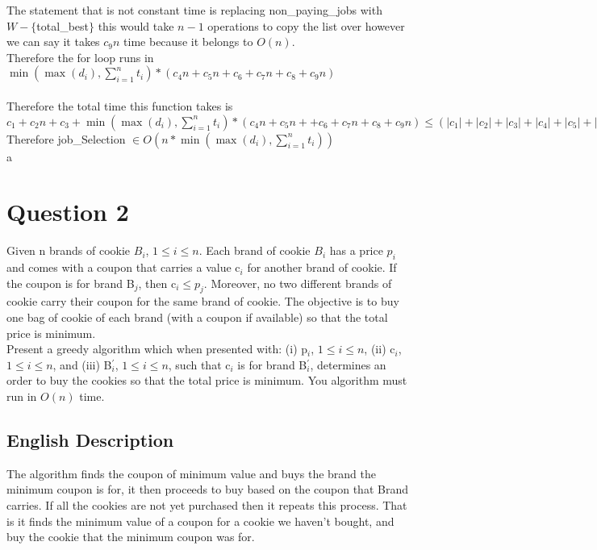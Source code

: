 \documentclass{article}
\begin{document}
        The statement that is not constant time is replacing non\_paying\_jobs with $W - \{$total\_best$\}$ this would take $n - 1$ operations to copy the list over however we can say it takes $c_{9}n$ time because it belongs to $O(n)$.\\
        Therefore the for loop runs in $\min(\max(d_{i}), \sum_{i = 1}^{n}t_{i}) * (c_{4}n + c_{5}n + c_{6} + c_{7}n + c_{8} + c_{9}n)$\\
        \\
        Therefore the total time this function takes is \\
        $c_{1} + c_{2}n + c_{3} + \min(\max(d_{i}), \sum_{i = 1}^{n}t_{i}) * (c_{4}n + c_{5}n + + c_{6} + c_{7}n + c_{8} + c_{9}n) \leq (|c_{1}| + |c_{2}| + |c_{3}| + |c_{4}| + |c_{5}| + |c_{6}| + |c_{7}| + |c_{8}| + c_{9}|)n * \min(\max(d_{i}), \sum_{i = 1}^{n}t_{i})$\\
        Therefore job\_Selection $\in O(n * \min(\max(d_{i}), \sum_{i = 1}^{n}t_{i}))$\\a
  \section{Question 2}
    Given n brands of cookie $B_{i}$, $1 \leq i \leq n$. Each brand of cookie $B_{i}$ has a price $p_{i}$ and comes with a coupon that carries a value c$_{i}$ for another brand of cookie. If the coupon is for brand B$_{j}$, then c$_{i} \leq p_{j}$. 
    Moreover, no two different brands of cookie carry their coupon for the same brand of cookie. The objective is to buy one bag of cookie of each brand (with a coupon if available) so that the total price is minimum.\\
    Present a greedy algorithm which when presented with: (i) p$_{i}$, $1 \leq i \leq n$, 
    (ii) c$_{i}$, $1 \leq i \leq n$,
    and (iii) B$_{i}^{'}$, $1 \leq i \leq n$, such that c$_{i}$ is for brand B$_{i}^{'}$, determines an order to buy the cookies so that the total price is minimum. You algorithm must run in $O(n)$ time.\\
    \subsection{English Description}
      The algorithm finds the coupon of minimum value and buys the brand the minimum coupon is for, it then proceeds to buy based on the coupon that Brand carries. If all the cookies are not yet purchased then it repeats this process. That is it finds the minimum value of a coupon for a cookie we haven't bought, and buy the cookie that the minimum coupon was for.\\
\end{document}
